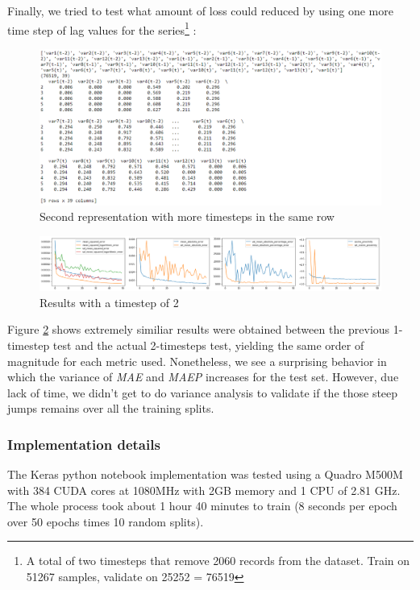 \documentclass[]{article}
\let\rmarkdownfootnote\footnote%
\def\footnote{\protect\rmarkdownfootnote}
\theoremstyle{definition}
\theoremstyle{definition}
\theoremstyle{definition}
\theoremstyle{remark}
\begin{document}
Finally, we tried to test what amount of loss could reduced by using one
more time step of lag values for the series\footnote{A total of two
  timesteps that remove 2060 records from the dataset. Train on 51267
  samples, validate on 25252 = 76519} :

\begin{figure}

{\centering \includegraphics[width=0.5\linewidth]{./media/example_representation3} 

}

\caption{Second representation with more timesteps in the same row}\label{fig:fig10}
\end{figure}

\begin{figure}

{\centering \includegraphics[width=1\linewidth]{./media/res_2} 

}

\caption{Results with a timestep of 2}\label{fig:fig11}
\end{figure}

Figure \ref{fig:fig11} shows extremely similiar results were obtained
between the previous 1-timestep test and the actual 2-timesteps test,
yielding the same order of magnitude for each metric used. Nonetheless,
we see a surprising behavior in which the variance of \emph{MAE} and
\emph{MAEP} increases for the test set. However, due lack of time, we
didn't get to do variance analysis to validate if the those steep jumps
remains over all the training splits.

\subsubsection{Implementation details}\label{implementation-details}

The Keras python notebook implementation was tested using a Quadro M500M
with 384 CUDA cores at 1080MHz with 2GB memory and 1 CPU of 2.81 GHz.
The whole process took about 1 hour 40 minutes to train (8 seconds per
epoch over 50 epochs times 10 random splits).
\end{document}
